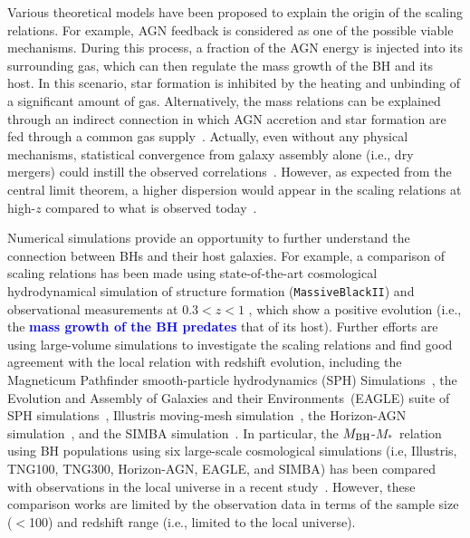 \documentclass[twocolumn]{aastex631}
\newcommand{\blue}[1]{\textcolor{blue}{\bf #1}}
\def\smass{{$M_*$}}
\def\mbh{$M_{\rm BH}$}
\begin{document}
Various theoretical models have been proposed to explain the origin of the scaling relations. For example, AGN feedback is considered as one of the possible viable mechanisms. During this process, a fraction of the AGN energy is injected into its surrounding gas, which can then regulate the mass growth of the BH and its host. In this scenario, star formation is inhibited by the heating and unbinding of a significant amount of gas. Alternatively, the mass relations can be explained through an indirect connection in which AGN accretion and star formation are fed through a common gas supply~\citep{Cen2015, Menci2016, angles_black_2017}. Actually, even without any physical mechanisms, statistical convergence from galaxy assembly alone (i.e., dry mergers) could instill the observed correlations~\citep{Peng2007, Jahnke2011, Hirschmann2010}. However, as expected from the central limit theorem, a higher dispersion would appear in the scaling relations at high-$z$ compared to what is observed today~\blue{\citep[e.g.,][]{Ginat2016, 2020MNRAS.498.5652K}}. 

Numerical simulations provide an opportunity to further understand the connection between BHs and their host galaxies. For example, a comparison of scaling relations has been made using state-of-the-art cosmological hydrodynamical simulation of structure formation ({\tt MassiveBlackII}) and observational measurements at  $0.3<z<1$ \citep[e.g., ][]{DeG++15}, which show a positive evolution (i.e., the \blue{mass growth of the BH predates} that of its host). Further efforts are using large-volume simulations to investigate the scaling relations and find good agreement with the local relation with redshift evolution, 
including the Magneticum Pathfinder smooth-particle hydrodynamics (SPH) Simulations~\citep{Steinborn2015}, the Evolution and Assembly of Galaxies and their Environments~(EAGLE) suite of SPH simulations~\citep{Schaye2015, Crain2015, McAlpine2016}, Illustris moving-mesh simulation~\citep{Genel2014, 2014MNRAS.444.1518V, Sijacki2015, Nelson2015, Li2019}, the Horizon-AGN simulation~\citep{2014MNRAS.444.1453D, 2016MNRAS.463.3948D, 2016MNRAS.460.2979V}, and the SIMBA simulation~\citep{Thomas2019, Dave2019}.
In particular, the \mbh-\smass\ relation using BH populations using six large-scale cosmological simulations (i.e, Illustris, TNG100, TNG300, Horizon-AGN, EAGLE, and SIMBA) has been compared with observations in the local universe in a recent study~\citep{Habouzit2021}. However, these comparison works are limited by the observation data in terms of the sample size ($<$100) and redshift range (i.e., limited to the local universe).
\end{document}
